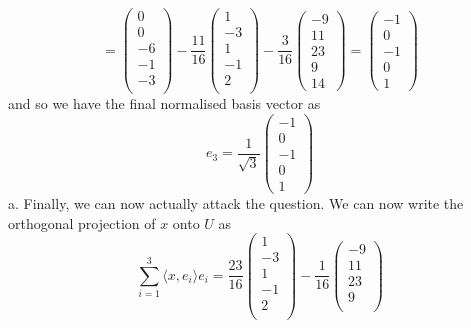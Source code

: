 \documentclass{article}
\newcommand{\chapternumber}{3}
\newenvironment{QandA}{\begin{enumerate}[label=\chapternumber.\arabic*]\bfseries\boldmath}
	{\end{enumerate}}
\newenvironment{answered}{\par\bigskip\normalfont\unboldmath}{}
\begin{document}
\begin{QandA}
\begin{answered}
\[			\]
			\[
			= 
			\begin{pmatrix}
				0 \\  0 \\  -6 \\  -1 \\  -3 \\
			\end{pmatrix}
			- \frac{11}{16}
			\begin{pmatrix}
				1 \\ -3 \\  1 \\ -1 \\  2 \\
			\end{pmatrix}
			- \frac{3}{16}
			\begin{pmatrix}
				-9 \\
				11 \\
				23 \\
				9 \\
				14
			\end{pmatrix}
			=
			\begin{pmatrix}
				-1 \\
				0 \\
				-1 \\
				0 \\
				1
			\end{pmatrix}
			\]
			and so we have the final normalised basis vector as
			\[e_3 = \frac{1}{\sqrt{3}}
			\begin{pmatrix}
				-1 \\
				0 \\
				-1 \\
				0 \\
				1
			\end{pmatrix}
			\]
			a. Finally, we can now actually attack the question. We can now write the orthogonal projection of $x$ onto $U$ as
			\[\sum_{i=1}^{3}\langle x,e_i \rangle e_i
			=
			\frac{23}{16}
			\begin{pmatrix}
				1 \\ -3 \\  1 \\ -1 \\  2 \\
			\end{pmatrix}
			-
			\frac{1}{16}
			\begin{pmatrix}
				-9 \\
				11 \\
				23 \\
				9 \\

\end{pmatrix}\]
\end{answered}
\end{QandA}
\end{document}
